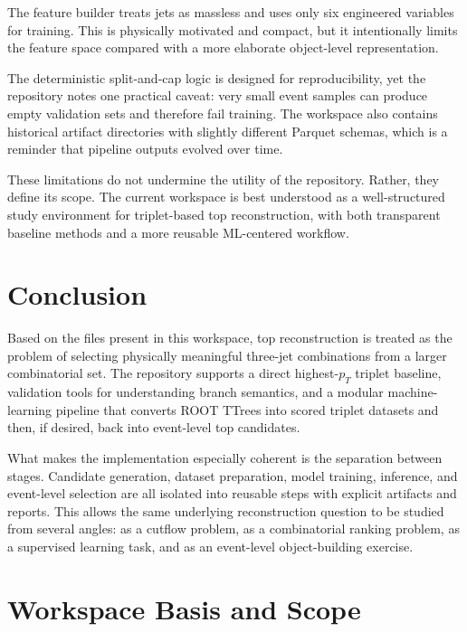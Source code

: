 \documentclass[11pt]{article}
\begin{document}
The feature builder treats jets as massless and uses only six engineered variables for training. This is physically motivated and compact, but it intentionally limits the feature space compared with a more elaborate object-level representation.

The deterministic split-and-cap logic is designed for reproducibility, yet the repository notes one practical caveat: very small event samples can produce empty validation sets and therefore fail training. The workspace also contains historical artifact directories with slightly different Parquet schemas, which is a reminder that pipeline outputs evolved over time.

These limitations do not undermine the utility of the repository. Rather, they define its scope. The current workspace is best understood as a well-structured study environment for triplet-based top reconstruction, with both transparent baseline methods and a more reusable ML-centered workflow.

\section{Conclusion}

Based on the files present in this workspace, top reconstruction is treated as the problem of selecting physically meaningful three-jet combinations from a larger combinatorial set. The repository supports a direct highest-$p_T$ triplet baseline, validation tools for understanding branch semantics, and a modular machine-learning pipeline that converts ROOT TTrees into scored triplet datasets and then, if desired, back into event-level top candidates.

What makes the implementation especially coherent is the separation between stages. Candidate generation, dataset preparation, model training, inference, and event-level selection are all isolated into reusable steps with explicit artifacts and reports. This allows the same underlying reconstruction question to be studied from several angles: as a cutflow problem, as a combinatorial ranking problem, as a supervised learning task, and as an event-level object-building exercise.

\appendix

\section{Workspace Basis and Scope}
\end{document}
